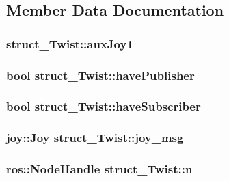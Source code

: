 \subsection{Member Data Documentation}
\hypertarget{classstruct__Twist_a62e055e979ef7e00e4fa5b28e5af58a3}{
\subsubsection[{auxJoy1}]{ {\bf struct\_\-Twist::auxJoy1}}}
\label{classstruct__Twist_a62e055e979ef7e00e4fa5b28e5af58a3}
\hypertarget{classstruct__Twist_a56123bf7b16afa13ca976101c263f9e1}{
\subsubsection[{havePublisher}]{\setlength{\rightskip}{0pt plus 5cm}bool {\bf struct\_\-Twist::havePublisher}}}
\label{classstruct__Twist_a56123bf7b16afa13ca976101c263f9e1}
\hypertarget{classstruct__Twist_af4ebb0d68d02c7e0bc6f4ef01a28f3f9}{
\subsubsection[{haveSubscriber}]{\setlength{\rightskip}{0pt plus 5cm}bool {\bf struct\_\-Twist::haveSubscriber}}}
\label{classstruct__Twist_af4ebb0d68d02c7e0bc6f4ef01a28f3f9}
\hypertarget{classstruct__Twist_a71712cfdc47912e38edf31527ddabdf0}{
\subsubsection[{joy\_\-msg}]{\setlength{\rightskip}{0pt plus 5cm}joy::Joy {\bf struct\_\-Twist::joy\_\-msg}}}
\label{classstruct__Twist_a71712cfdc47912e38edf31527ddabdf0}
\hypertarget{classstruct__Twist_a2d3e2346abef34de6bb72a5b783a367e}{
\subsubsection[{n}]{\setlength{\rightskip}{0pt plus 5cm}ros::NodeHandle {\bf struct\_\-Twist::n}}}

